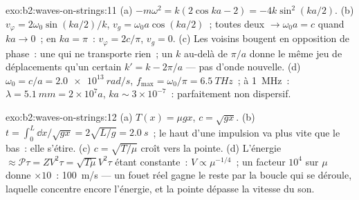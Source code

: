 \begin{solution}{exo:b2:waves-on-strings:11}
(a) $-m\omega^2 = k(2\cos ka - 2) = -4k\sin^2(ka/2)$. (b) $v_\varphi = 2\omega_0\sin(ka/2)
/k$, $v_g = \omega_0a\cos(ka/2)$~; toutes deux $\to \omega_0a = c$ quand $ka \to 0$~; en $ka = \pi$~:
$v_\varphi = 2c/\pi$, $v_g = 0$. (c) Les voisins bougent en opposition de phase~: une  qui ne transporte rien~; un $k$ au-delà de $\pi/a$ donne le même jeu de
déplacements qu'un certain $k' = k - 2\pi/a$ --- pas d'onde nouvelle. (d) $\omega_0 = c/a =
\qty{2.0e13}{rad/s}$, $f_{\max} = \omega_0/\pi = \qty{6.5}{THz}$~; à \qty{1}{MHz}~: $\lambda =
\qty{5.1}{mm} = 2 \times 10^7a$, $ka \sim 3 \times 10^{-7}$~: parfaitement non dispersif.
\end{solution}

\begin{solution}{exo:b2:waves-on-strings:12}
(a) $T(x) = \mu gx$, $c = \sqrt{gx}$. (b) $t = \int_0^L\dd x/\sqrt{gx} = 2\sqrt{L/g} =
\qty{2.0}{s}$~; le haut d'une impulsion va plus vite que le bas~: elle
s'étire. (c) $c = \sqrt{T/\mu}$ croît vers la pointe. (d) L'énergie $\approx
\mathcal P\tau = ZV^2\tau = \sqrt{T\mu}V^2\tau$ étant constante~: $V \propto \mu^{-1/4}$~; un
facteur $10^4$ sur $\mu$ donne $\times10$~: \qty{100}{m/s} --- un fouet réel gagne
le reste par la boucle qui se déroule, laquelle concentre encore l'énergie,
et la pointe dépasse la vitesse du son.
\end{solution}

